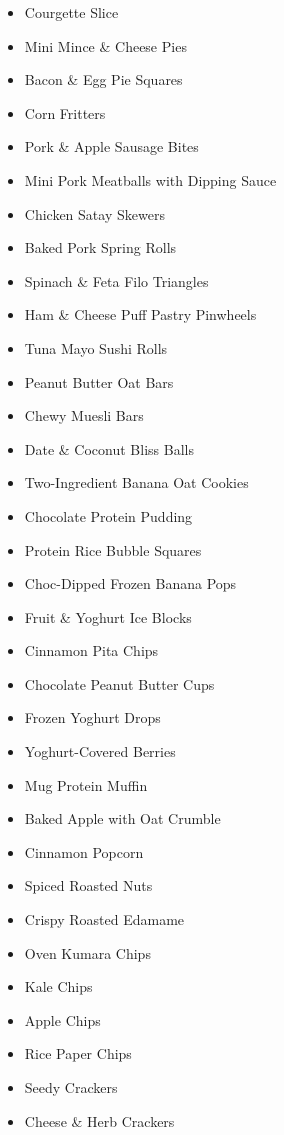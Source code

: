 \begin{itemize}
  \item \todo Courgette Slice 
  \item \todo Mini Mince \& Cheese Pies 
  \item \todo Bacon \& Egg Pie Squares
  \item \todo Corn Fritters
  \item \todo Pork \& Apple Sausage Bites
  \item \todo Mini Pork Meatballs with Dipping Sauce
  \item \todo Chicken Satay Skewers
  \item \todo Baked Pork Spring Rolls
  \item \todo Spinach \& Feta Filo Triangles
  \item \todo Ham \& Cheese Puff Pastry Pinwheels
  \item \todo Tuna Mayo Sushi Rolls
\end{itemize}

\begin{itemize}
  \item \todo Peanut Butter Oat Bars
  \item \todo Chewy Muesli Bars
  \item \todo Date \& Coconut Bliss Balls
  \item \todo Two-Ingredient Banana Oat Cookies
  \item \todo Chocolate Protein Pudding
  \item \todo Protein Rice Bubble Squares
  \item \todo Choc-Dipped Frozen Banana Pops
  \item \todo Fruit \& Yoghurt Ice Blocks
  \item \todo Cinnamon Pita Chips
  \item \todo Chocolate Peanut Butter Cups
  \item \todo Frozen Yoghurt Drops
  \item \todo Yoghurt-Covered Berries
  \item \todo Mug Protein Muffin
  \item \todo Baked Apple with Oat Crumble
  \item \todo Cinnamon Popcorn
\end{itemize}

\begin{itemize}
  \item \todo Spiced Roasted Nuts
  \item \todo Crispy Roasted Edamame
  \item \todo Oven Kumara Chips
  \item \todo Kale Chips
  \item \todo Apple Chips
  \item \todo Rice Paper Chips
  \item \todo Seedy Crackers
  \item \todo Cheese \& Herb Crackers
\end{itemize}

